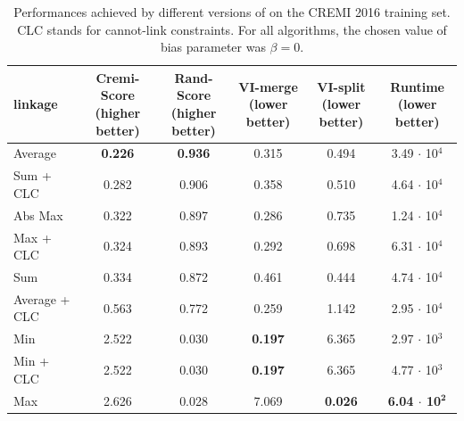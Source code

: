 \begin{table}[t]
\centering
    \footnotesize
        \begin{tabular}{l|c|c|c|c|c}
          \algname{} linkage & \makecell{Cremi-Score\\(higher better)}  & \makecell{Rand-Score\\(higher better)} & \makecell{VI-merge\\(lower better)} & \makecell{VI-split\\(lower better)} & \makecell{Runtime\\(lower better)} \\ \midrule

Average & \textbf{0.226} & \textbf{0.936} & 0.315 & 0.494 & 3.49 $\cdot$ 10$^4$ \\
Sum + CLC \cite{levinkov2017comparative} & 0.282 & 0.906 & 0.358 & 0.510 & 4.64 $\cdot$ 10$^4$ \\
Abs Max \cite{wolf2018mutex} & 0.322 & 0.897 & 0.286 & 0.735 & 1.24 $\cdot$ 10$^4$ \\
Max + CLC & 0.324 & 0.893 & 0.292 & 0.698 & 6.31 $\cdot$ 10$^4$ \\
Sum \cite{keuper2015efficient} & 0.334 & 0.872 & 0.461 & 0.444 & 4.74 $\cdot$ 10$^4$ \\
Average + CLC & 0.563 & 0.772 & 0.259  & 1.142 & 2.95 $\cdot$ 10$^4$ \\
Min & 2.522 & 0.030 & \textbf{0.197} & 6.365 & 2.97 $\cdot$ 10$^3$ \\
Min + CLC & 2.522 & 0.030 & \textbf{0.197}  & 6.365 & 4.77 $\cdot$ 10$^3$ \\
Max & 2.626 & 0.028 & 7.069 & \textbf{0.026} & \textbf{6.04 $\cdot$ 10$^\mathbf{2}$} \\
        \end{tabular}
        \vspace*{1.1em}
    \caption{Performances achieved by different versions of \algname{} on the CREMI 2016 training set. CLC stands for cannot-link constraints. For all algorithms, the chosen value of bias parameter was $\beta = 0$.}
    \label{tab:extended_results_cremi}
\end{table}
